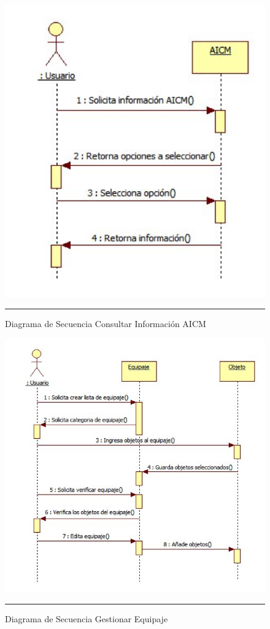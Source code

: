 \begin{figure}[H]
	\centering
		\includegraphics[width=1\textwidth]{Figuras/secConsultarInformacionAICM.png}
		\rule{30em}{0.5pt}
	\caption[Diagrama de Secuencia Consultar Información AICM]{Diagrama de Secuencia Consultar Información AICM}
	\label{fig:secConsultarInformacionAICM}
\end{figure}

\begin{figure}[H]
	\centering
		\includegraphics[width=1\textwidth]{Figuras/secGestionarEquipaje.png}
		\rule{30em}{0.5pt}
	\caption[Diagrama de Secuencia Gestionar Equipaje]{Diagrama de Secuencia Gestionar Equipaje}
	\label{fig:secGestionarEquipaje}
\end{figure}

